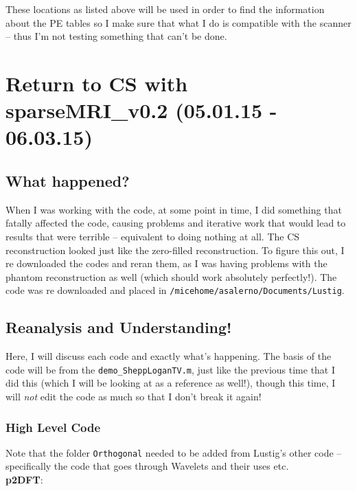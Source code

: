 \documentclass[11 pt]{article}
\newcommand{\bo}{\noindent\textbf}
\let\oldsection\section
\renewcommand\section{\clearpage\newpage\oldsection}
\begin{document}
      These locations as listed above will be used in order to find the information about the PE tables so I make sure that what I do is compatible with the scanner -- thus I'm not testing something that can't be done. 



\section{Return to CS with sparseMRI\_v0.2 (05.01.15 - 06.03.15)}

  \subsection{What happened?}

    When I was working with the code, at some point in time, I did something that fatally affected the code, causing problems and iterative work that would lead to results that were terrible -- equivalent to doing nothing at all. The CS reconstruction looked just like the zero-filled reconstruction. To figure this out, I re downloaded the codes and reran them, as I was having problems with the phantom reconstruction as well (which should work absolutely perfectly!). The code was re downloaded and placed in \verb!/micehome/asalerno/Documents/Lustig!.

  \subsection{Reanalysis and Understanding!}

    Here, I will discuss each code and exactly what's happening. The basis of the code will be from the \verb!demo_SheppLoganTV.m!, just like the previous time that I did this (which I will be looking at as a reference as well!), though this time, I will \emph{not} edit the code as much so that I don't break it again!

    \subsubsection{High Level Code}

      Note that the folder \verb!Orthogonal! needed to be added from Lustig's other code -- specifically the code that goes through Wavelets and their uses etc. \\

      \bo{p2DFT}:\\
\end{document}

